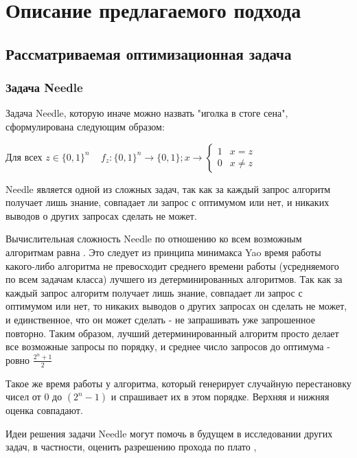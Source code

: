 \chapter{Описание предлагаемого подхода}
\label{chapter2}

\section{Рассматриваемая оптимизационная задача}
\subsection{Задача Needle}
Задача Needle, которую иначе можно назвать "иголка в стоге сена", сформулирована следующим образом: 

Для всех $z \in \{0, 1\}^n \;\;\; $  
    \begin{math} 
    f_{z} : \{0, 1 \}^n \rightarrow \{0,1\}; x \rightarrow  \left\{ \begin{array}{ll}
    1 & \textrm{$x = z$}\\
    0 & \textrm{$x \ne z$}
    \end{array} \right.
    \end{math}

Needle является одной из сложных задач, так как за каждый запрос алгоритм получает лишь знание, совпадает ли запрос с оптимумом или нет, и никаких выводов о других запросах сделать не может. 

Вычислительная сложность Needle по отношению ко всем возможным
алгоритмам равна . Это следует из принципа минимакса Yao \cite{5} время работы какого-либо алгоритма не превосходит среднего времени
работы (усредняемого по всем задачам класса) лучшего из детерминированных алгоритмов. Так как за каждый запрос алгоритм получает лишь знание, совпадает ли запрос с оптимумом или нет, то никаких выводов о других запросах он сделать не может, и единственное, что он может сделать - не запрашивать уже запрошенное повторно. Таким образом, лучший детерминированный алгоритм просто делает все возможные запросы по порядку, и среднее число запросов до оптимума - ровно $\frac{2^n + 1}{2}$

Такое же время работы у алгоритма, который генерирует случайную перестановку чисел от 0 до $(2^n - 1)$ и спрашивает их в этом порядке. Верхняя и нижняя оценка совпадают.

Идеи решения задачи Needle могут помочь в будущем в исследовании других задач, в частности, оценить разрешению прохода по плато \cite{6}, 

